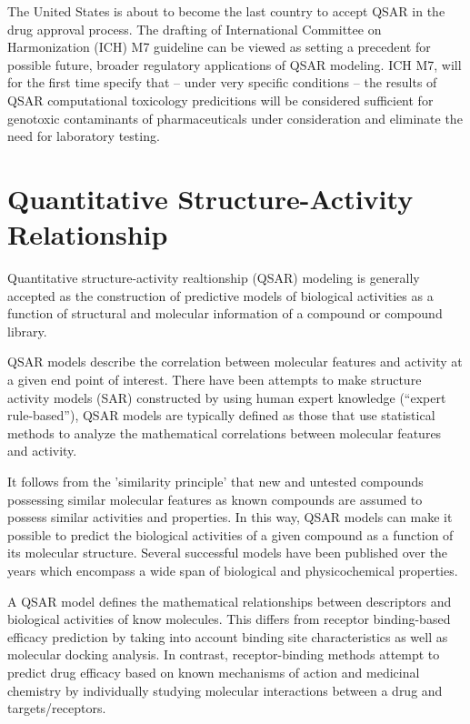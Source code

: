 The United States is about to become the last country to accept QSAR in the drug approval process. The drafting of International Committee on Harmonization (ICH) M7 guideline can be viewed as setting a precedent for possible future, broader regulatory applications of QSAR modeling. ICH M7, will for the first time specify that -- under very specific conditions -- the results of QSAR computational toxicology predicitions will be considered sufficient for genotoxic contaminants of pharmaceuticals under consideration and eliminate the need for laboratory testing. \cite{Kruhlak2012}


\section{Quantitative Structure-Activity Relationship}

Quantitative structure-activity realtionship (QSAR) modeling is generally accepted as the construction of predictive models of biological activities as a function of structural and molecular information of a compound or compound library.\cite{Nantasenamat2009}

QSAR models describe the correlation between molecular features and activity at a given end point of interest. There have been attempts to make structure activity models (SAR) constructed by using human expert knowledge (“expert rule-based”), QSAR models are typically defined as those that use statistical methods to analyze the mathematical correlations between molecular features and activity. 

It follows from the 'similarity principle' that new and untested compounds possessing similar molecular features as known compounds are assumed to possess similar activities and properties. In this way, QSAR models can make it possible to predict the biological activities of a given compound as a function of its molecular structure. Several successful models have been published over the years which encompass a wide span of biological and physicochemical properties.

A QSAR model defines the mathematical relationships between descriptors and biological activities of know molecules. This differs from receptor binding-based efficacy prediction by taking into account binding site characteristics as well as molecular docking analysis. In contrast, receptor-binding methods attempt to predict drug efficacy based on known mechanisms of action and medicinal chemistry by individually studying molecular interactions between a drug and targets/receptors. \cite{Kruhlak2012}

